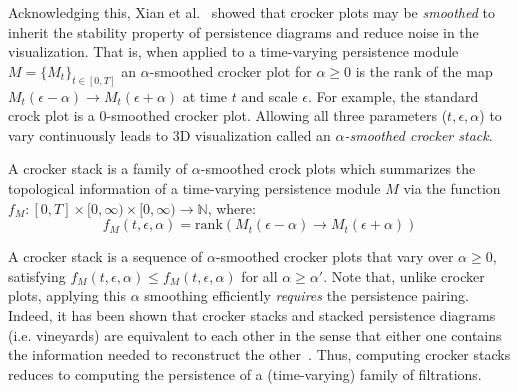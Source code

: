 \documentclass{siamart190516}
\begin{document}
Acknowledging this, Xian et al.~\cite{xian2020capturing} showed that crocker plots may be \emph{smoothed} to inherit the stability property of persistence diagrams and reduce noise in the visualization. That is, when applied to a time-varying persistence module $M = \{M_t\}_{t \in [0, T]}$ an $\alpha$-smoothed crocker plot for $\alpha \geq 0$ is the rank of the map $M_t(\epsilon - \alpha) \to M_t(\epsilon + \alpha)$ at time $t$ and scale $\epsilon$. For example, the standard crock plot is a $0$-smoothed crocker plot. Allowing all three parameters ($t, \epsilon, \alpha$) to vary continuously leads to 3D visualization called an $\alpha$\emph{-smoothed crocker stack}.
\begin{definition}
	A crocker stack is a family of $\alpha$-smoothed crock plots which summarizes the topological information of a time-varying persistence module $M$ via the function $f_M : [0, T] \times [0, \infty) \times [0, \infty) \to \mathbb{N}$, where:
	$$ f_M(t,\epsilon, \alpha) = \mathrm{rank}(M_t(\epsilon - \alpha) \to M_t(\epsilon + \alpha)) $$
\end{definition}
\noindent A crocker stack is a sequence of $\alpha$-smoothed crocker plots that vary over $\alpha \geq 0$, satisfying $f_M(t,\epsilon,\alpha) \leq f_M(t,\epsilon, \alpha)$ for all $\alpha \geq \alpha'$. Note that, unlike crocker plots, applying this $\alpha$ smoothing efficiently \emph{requires} the persistence pairing. Indeed, it has been shown that crocker stacks and stacked persistence diagrams (i.e. vineyards) are equivalent to each other in the sense that either one contains the information needed to reconstruct the other~\cite{xian2020capturing}. Thus, computing crocker stacks reduces to computing the persistence of a (time-varying) family of filtrations.

\end{document}
